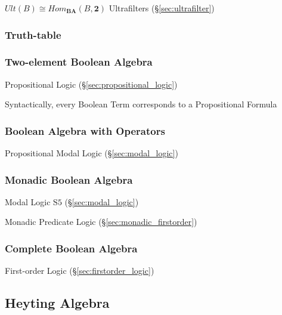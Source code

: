 $Ult(B) \cong Hom_\mathbf{BA}(B,\mathbf{2})$ Ultrafilters
(\S\ref{sec:ultrafilter})



\subsubsection{Truth-table}\label{sec:truth_table}

\subsubsection{Two-element Boolean Algebra}\label{sec:twoelement_boolean}

Propositional Logic (\S\ref{sec:propositional_logic})

Syntactically, every Boolean Term corresponds to a Propositional
Formula



\subsubsection{Boolean Algebra with Operators}\label{sec:boolean_with_operators}

Propositional Modal Logic (\S\ref{sec:modal_logic})



\subsubsection{Monadic Boolean Algebra}\label{sec:monadic_boolean}

Modal Logic $\mathrm{S5}$ (\S\ref{sec:modal_logic})

Monadic Predicate Logic (\S\ref{sec:monadic_firstorder})



\subsubsection{Complete Boolean Algebra}\label{sec:complete_boolean}

First-order Logic (\S\ref{sec:firstorder_logic})



\subsection{Heyting Algebra}\label{sec:heyting_algebra}

